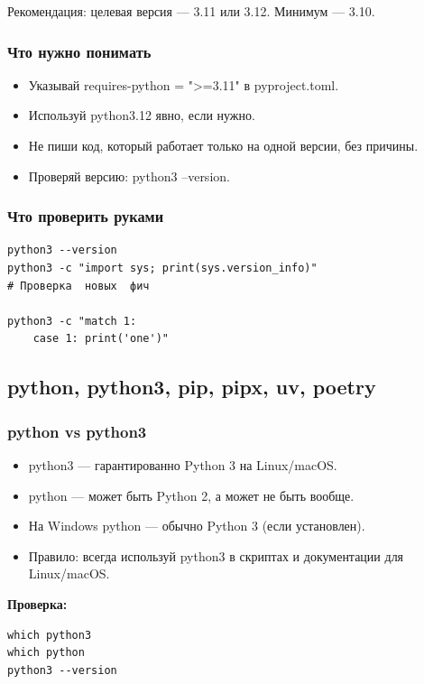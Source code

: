 \begin{warningbox2}
Рекомендация: целевая версия — 3.11 или 3.12. Минимум — 3.10.
\end{warningbox2}

\subsubsection{Что нужно понимать}
\begin{itemize}
\item Указывай requires-python = ">=3.11" в pyproject.toml.
\item Используй python3.12 явно, если нужно.
\item Не пиши код, который работает только на одной версии, без причины.
\item Проверяй версию: python3 --version.
\end{itemize}
\subsubsection{Что проверить руками}
\begin{lstlisting}
python3 --version
python3 -c "import sys; print(sys.version_info)"
# Проверка  новых  фич

python3 -c "match 1:
    case 1: print('one')"
\end{lstlisting}

\subsection{ python, python3, pip, pipx, uv, poetry}
\subsubsection{python vs python3}
\begin{itemize}
\item python3 — гарантированно Python 3 на Linux/macOS.
\item python — может быть Python 2, а может не быть вообще.
\item На Windows python — обычно Python 3 (если установлен).
\item Правило: всегда используй python3 в скриптах и документации для Linux/macOS.
\end{itemize}

\textbf{Проверка:}
\begin{lstlisting}
which python3
which python
python3 --version
\end{lstlisting}


